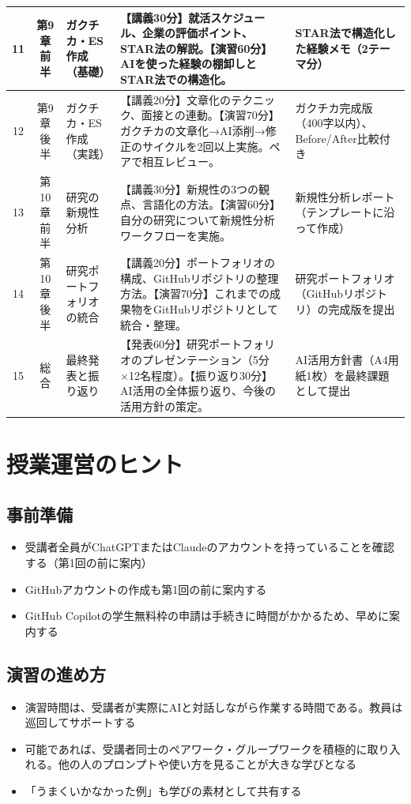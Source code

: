 \begin{longtable}{ccp{1.8cm}p{3.3cm}p{1.8cm}}
\hline
11 & 第9章前半 & ガクチカ・ES作成（基礎） & 【講義30分】就活スケジュール、企業の評価ポイント、STAR法の解説。【演習60分】AIを使った経験の棚卸しとSTAR法での構造化。 & STAR法で構造化した経験メモ（2テーマ分） \\
\hline
12 & 第9章後半 & ガクチカ・ES作成（実践） & 【講義20分】文章化のテクニック、面接との連動。【演習70分】ガクチカの文章化→AI添削→修正のサイクルを2回以上実施。ペアで相互レビュー。 & ガクチカ完成版（400字以内）、Before/After比較付き \\
\hline
13 & 第10章前半 & 研究の新規性分析 & 【講義30分】新規性の3つの観点、言語化の方法。【演習60分】自分の研究について新規性分析ワークフローを実施。 & 新規性分析レポート（テンプレートに沿って作成） \\
\hline
14 & 第10章後半 & 研究ポートフォリオの統合 & 【講義20分】ポートフォリオの構成、GitHubリポジトリの整理方法。【演習70分】これまでの成果物をGitHubリポジトリとして統合・整理。 & 研究ポートフォリオ（GitHubリポジトリ）の完成版を提出 \\
\hline
15 & 総合 & 最終発表と振り返り & 【発表60分】研究ポートフォリオのプレゼンテーション（5分×12名程度）。【振り返り30分】AI活用の全体振り返り、今後の活用方針の策定。 & AI活用方針書（A4用紙1枚）を最終課題として提出 \\
\end{longtable}

\section{授業運営のヒント}

\subsection*{事前準備}

\begin{itemize}
\item 受講者全員がChatGPTまたはClaudeのアカウントを持っていることを確認する（第1回の前に案内）
\item GitHubアカウントの作成も第1回の前に案内する
\item GitHub Copilotの学生無料枠の申請は手続きに時間がかかるため、早めに案内する
\end{itemize}

\subsection*{演習の進め方}

\begin{itemize}
\item 演習時間は、受講者が実際にAIと対話しながら作業する時間である。教員は巡回してサポートする
\item 可能であれば、受講者同士のペアワーク・グループワークを積極的に取り入れる。他の人のプロンプトや使い方を見ることが大きな学びとなる
\item 「うまくいかなかった例」も学びの素材として共有する
\end{itemize}

